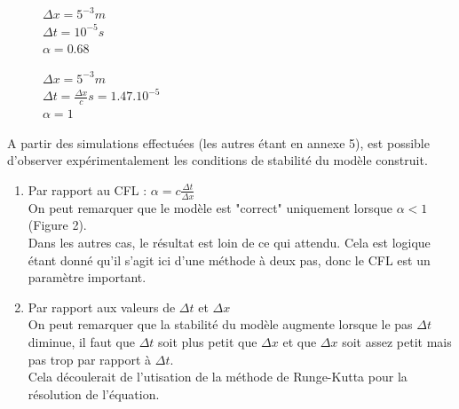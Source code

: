     
\begin{figure}[H]
\begin{minipage}[b]{.46\linewidth}
\centering{}
\caption{
        $\Delta x= 5^{-3}m $\\
        $\Delta t= 10^{-4}s$\\
        $\alpha = 6.8$
    \label{fig1}
    }
\end{minipage} \hfill
\begin{minipage}[b]{.46\linewidth}
\centering{}
\caption{$\Delta x= 5^{-3}m $\\ 
        $\Delta t= 10^{-5}s$\\
        $\alpha = 0.68$
        \label{fig2}}
\end{minipage}
\end{figure}

\begin{figure}[H]
\begin{minipage}[b]{.46\linewidth}
\centering{}
\caption{$\Delta x= 5^{-2}m $\\ 
        $\Delta t= 10^{-6}s$\\
        $\alpha = 0.0068$
        \label{fig1}}
\end{minipage} \hfill
\begin{minipage}[b]{.46\linewidth}
\centering{}
\caption{$\Delta x= 5^{-3} m $\\ 
        $\Delta t= \frac{\Delta x}{c}s= 1.47.10^{-5} $\\
        $\alpha = 1$
        \label{fig2}}
\end{minipage}
\end{figure}


A partir des simulations effectuées (les autres étant en annexe 5), est possible d'observer expérimentalement les conditions de stabilité du modèle construit.
\begin{enumerate}
    \item Par rapport au CFL : $\alpha = c\frac{\Delta t}{\Delta x}$\\
    On peut remarquer que le modèle est "correct" uniquement lorsque $\alpha < 1 $  (Figure 2).\\
    Dans les autres cas, le résultat est loin de ce qui attendu. Cela est logique étant donné qu'il s'agit ici d'une méthode à deux pas, donc le CFL est un paramètre important.
    \item Par rapport aux valeurs  de $\Delta t$ et $\Delta x$ \\
    On peut remarquer que la stabilité du modèle augmente lorsque le pas $\Delta t$ diminue, il faut que $\Delta t$ soit plus petit que $\Delta x$ et que $\Delta x$ soit assez petit mais pas trop par rapport à $\Delta t$.\\
    Cela découlerait de l'utisation de la méthode de Runge-Kutta pour la résolution de l'équation.
    
\end{enumerate}


